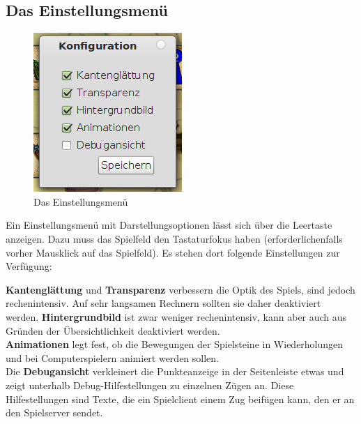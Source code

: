 \documentclass[a4paper, ngerman]{scrartcl}
\begin{document}
\subsection{Das Einstellungsmenü}
	 \begin{figure}[h]
		\centering
		\includegraphics[scale=0.5]{images/configuration}
		\caption{Das Einstellungsmenü}
		\label{fig:Configuration}
	\end{figure}	
Ein Einstellungsmenü mit Darstellungsoptionen lässt
sich über die Leertaste anzeigen. Dazu muss das
Spielfeld den Tastaturfokus haben (erforderlichenfalls
vorher Mausklick auf das Spielfeld). Es stehen dort
folgende Einstellungen zur Verfügung:

\textbf{Kantenglättung} und \textbf{Transparenz} verbessern die Optik des
Spiels, sind jedoch rechenintensiv. Auf sehr langsamen Rechnern sollten sie daher
deaktiviert werden. \textbf{Hintergrundbild} ist zwar weniger rechenintensiv,
kann aber auch aus Gründen der Übersichtlichkeit deaktiviert werden.\\
\textbf{Animationen} legt fest, ob die Bewegungen der Spielsteine in
Wiederholungen und bei Computerspielern animiert werden sollen.\\
Die \textbf{Debugansicht} verkleinert die Punkteanzeige in der Seitenleiste
etwas und zeigt unterhalb Debug-Hilfestellungen zu einzelnen Zügen an. Diese
Hilfestellungen sind Texte, die ein Spielclient einem Zug beifügen kann, den er
an den Spielserver sendet.
	
\end{document}
